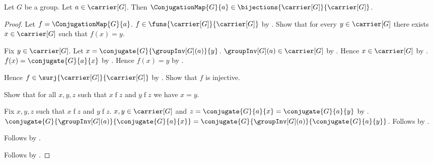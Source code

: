 \begin{theorem}\label{conjugation_map_bijection}
    Let $G$ be a group.
    Let $a\in\carrier[G]$.
    Then $\ConjugationMap{G}{a}\in
        \bijections{\carrier[G]}{\carrier[G]}$.
\end{theorem}
\begin{proof}
    Let $f=\ConjugationMap{G}{a}$.
    $f\in\funs{\carrier[G]}{\carrier[G]}$ by
        .
    Show that for every $y\in\carrier[G]$ there exists
        $x\in\carrier[G]$ such that $f(x)=y$.
    \begin{subproof}
        Fix $y\in\carrier[G]$.
        Let $x=\conjugate{G}{\groupInv[G](a)}{y}$.
        $\groupInv[G](a)\in\carrier[G]$ by
            .
        Hence $x\in\carrier[G]$ by
            .
        $f(x)=\conjugate{G}{a}{x}$ by
            .
        Hence $f(x)=y$ by .
    \end{subproof}
    Hence $f\in\surj{\carrier[G]}{\carrier[G]}$ by
        .
    Show that $f$ is injective.
    \begin{subproof}
        Show that for all $x,y,z$ such that $x\mathrel{f}z$ and
            $y\mathrel{f}z$ we have $x=y$.
        \begin{subproof}
            Fix $x,y,z$ such that $x\mathrel{f}z$ and
                $y\mathrel{f}z$.
            $x,y\in\carrier[G]$ and
                $z=\conjugate{G}{a}{x}=\conjugate{G}{a}{y}$ by
                .
            $\conjugate{G}{\groupInv[G](a)}
                {\conjugate{G}{a}{x}}
                =\conjugate{G}{\groupInv[G](a)}
                    {\conjugate{G}{a}{y}}$.
            Follows by .
        \end{subproof}
        Follows by .
    \end{subproof}
    Follows by .
\end{proof}

